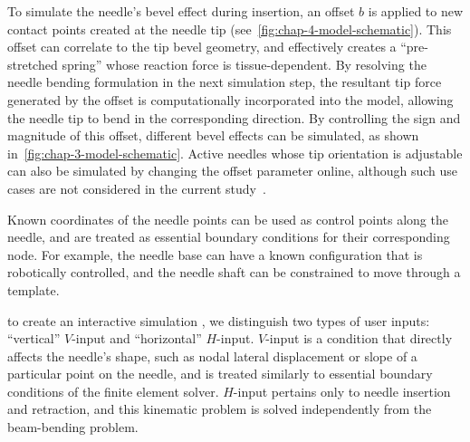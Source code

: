 To simulate the needle's bevel effect during insertion, an offset $b$ is applied to new contact points created at the needle tip (see~\cref{fig:chap-4-model-schematic}). This offset can correlate to the tip bevel geometry, and effectively creates a ``pre-stretched spring'' whose reaction force is tissue-dependent. By resolving the needle bending formulation in the next simulation step, the resultant tip force generated by the offset is computationally incorporated into the model, allowing the needle tip to bend in the corresponding direction. By controlling the sign and magnitude of this offset, different bevel effects can be simulated, as shown in~\cref{fig:chap-3-model-schematic}. Active needles whose tip orientation is adjustable can also be simulated by changing the offset parameter online, although such use cases are not considered in the current study~\parencite{ryuFeasibilityStudyOptically2011,karimi3DSteerableActive2019,padasdaoShapeMemoryAlloy2020}.

Known coordinates of the needle points can be used as control points along the needle, and are treated as essential boundary conditions for their corresponding node. For example, the needle base can have a known configuration that is robotically controlled, and the needle shaft can be constrained to move through a template.

\printnomenclature[1.25in]

to create an interactive simulation , we distinguish two types of user inputs: ``vertical'' $V$-input and ``horizontal'' $H$-input. $V$-input is a condition that directly affects the needle's shape, such as nodal lateral displacement or slope of a particular point on the needle, and is treated similarly to essential boundary conditions of the finite element solver. $H$-input pertains only to needle insertion and retraction, and this kinematic problem is solved independently from the beam-bending problem. 

